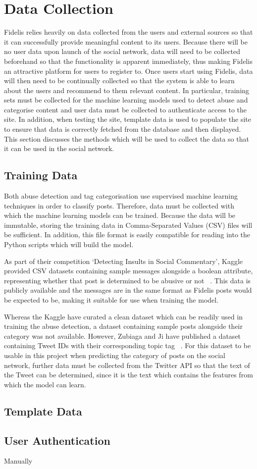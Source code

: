 \section{Data Collection}
Fidelis relies heavily on data collected from the users and external sources so that it can successfully provide meaningful content to its users. Because there will be no user data upon launch of the social network, data will need to be collected beforehand so that the functionality is apparent immediately, thus making Fidelis an attractive platform for users to register to. Once users start using Fidelis, data will then need to be continually collected so that the system is able to learn about the users and recommend to them relevant content. In particular, training sets must be collected for the machine learning models used to detect abuse and categorise content and user data must be collected to authenticate access to the site. In addition, when testing the site, template data is used to populate the site to ensure that data is correctly fetched from the database and then displayed. This section discusses the methods which will be used to collect the data so that it can be used in the social network.

\subsection{Training Data}
Both abuse detection and tag categorisation use supervised machine learning techniques in order to classify posts.  Therefore, data must be collected with which the machine learning models can be trained. Because the data will be immutable, storing the training data in Comma-Separated Values (CSV) files will be sufficient. In addition, this file format is easily compatible for reading into the Python scripts which will build the model.

As part of their competition `Detecting Insults in Social Commentary', Kaggle provided CSV datasets containing sample messages alongside a boolean attribute, representing whether that post is determined to be abusive or not ~\cite{Kaggle:Dataset}. This data is publicly available and the messages are in the same format as Fidelis posts would be expected to be, making it suitable for use when training the model.

Whereas the Kaggle have curated a clean dataset which can be readily used in training the abuse detection, a dataset containing sample posts alongside their category was not available. However, Zubiaga and Ji have published a dataset containing Tweet IDs with their corresponding topic tag ~\cite{Zubiaga:Tweets}. For this dataset to be usable in this project when predicting the category of posts on the social network, further data must be collected from the Twitter API so that the text of the Tweet can be determined, since it is the text which contains the features from which the model can learn.

\subsection{Template Data}


\subsection{User Authentication}
Manually